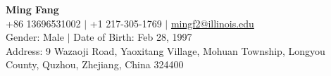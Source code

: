 \documentclass[letterpaper,11pt]{article} %
\begin{document}

% 
\begin{comment}
In Europe it is common to include a picture of ones self in the CV. Select
which heading appropriate for the document you are creating.
\end{comment}


\begin{center}
    \textbf{\Huge Ming Fang} \\ \vspace{1pt} %
    +86 13696531002 $|$
    +1 217-305-1769 $|$
    \href{mailto:mingf2@illinois.edu}{{mingf2@illinois.edu}}\\
    {Gender: Male $|$ Date of Birth: Feb 28, 1997}\\
    {Address: 9 Wazaoji Road, Yaoxitang Village, Mohuan Township, Longyou County, Quzhou, Zhejiang, China 324400}
\end{center}
\end{document}
